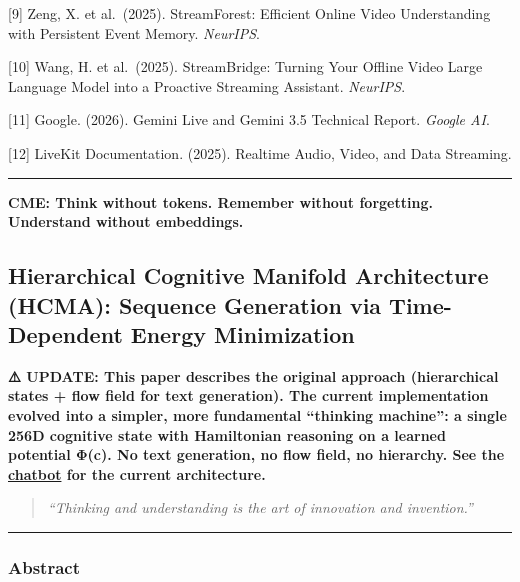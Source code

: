 \documentclass[
  11pt,
  a4paper,
]{article}
\begin{document}
{[}9{]} Zeng, X. et al.~(2025). StreamForest: Efficient Online Video
Understanding with Persistent Event Memory. \emph{NeurIPS}.

{[}10{]} Wang, H. et al.~(2025). StreamBridge: Turning Your Offline
Video Large Language Model into a Proactive Streaming Assistant.
\emph{NeurIPS}.

{[}11{]} Google. (2026). Gemini Live and Gemini 3.5 Technical Report.
\emph{Google AI}.

{[}12{]} LiveKit Documentation. (2025). Realtime Audio, Video, and Data
Streaming.

\begin{center}\rule{0.5\linewidth}{0.5pt}\end{center}

\textbf{CME: Think without tokens. Remember without forgetting.
Understand without embeddings.}

\newpage

\subsection{Hierarchical Cognitive Manifold Architecture (HCMA):
Sequence Generation via Time-Dependent Energy
Minimization}\label{hierarchical-cognitive-manifold-architecture-hcma-sequence-generation-via-time-dependent-energy-minimization}

\textbf{⚠️ UPDATE: This paper describes the original approach
(hierarchical states + flow field for text generation). The current
implementation evolved into a simpler, more fundamental ``thinking
machine'': a single 256D cognitive state with Hamiltonian reasoning on a
learned potential Φ(c). No text generation, no flow field, no hierarchy.
See the \href{../src/chatbot.cpp}{chatbot} for the current
architecture.}

\begin{quote}
\emph{``Thinking and understanding is the art of innovation and
invention.''}
\end{quote}

\begin{center}\rule{0.5\linewidth}{0.5pt}\end{center}

\subsubsection{Abstract}\label{abstract-6}
\end{document}
